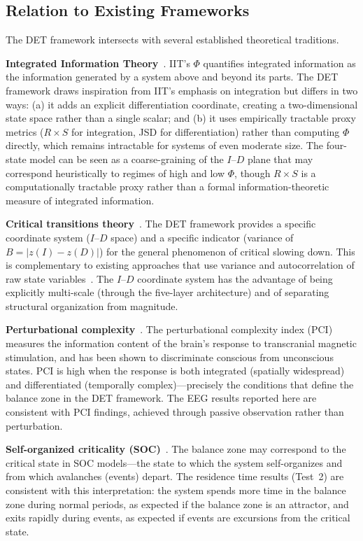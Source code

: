 \documentclass[12pt,a4paper]{article}
\begin{document}
\subsection{Relation to Existing Frameworks}

The DET framework intersects with several established theoretical traditions.

\textbf{Integrated Information Theory}~\cite{tononi2016}. IIT's $\Phi$ quantifies integrated information as the information generated by a system above and beyond its parts. The DET framework draws inspiration from IIT's emphasis on integration but differs in two ways: (a) it adds an explicit differentiation coordinate, creating a two-dimensional state space rather than a single scalar; and (b) it uses empirically tractable proxy metrics ($R \times S$ for integration, JSD for differentiation) rather than computing $\Phi$ directly, which remains intractable for systems of even moderate size. The four-state model can be seen as a coarse-graining of the $I$--$D$ plane that may correspond heuristically to regimes of high and low $\Phi$, though $R \times S$ is a computationally tractable proxy rather than a formal information-theoretic measure of integrated information.

\textbf{Critical transitions theory}~\cite{scheffer2009,strogatz2015}. The DET framework provides a specific coordinate system ($I$--$D$ space) and a specific indicator (variance of $B = |z(I) - z(D)|$) for the general phenomenon of critical slowing down. This is complementary to existing approaches that use variance and autocorrelation of raw state variables~\cite{dakos2012}. The $I$--$D$ coordinate system has the advantage of being explicitly multi-scale (through the five-layer architecture) and of separating structural organization from magnitude.

\textbf{Perturbational complexity}~\cite{casali2013,sarasso2015}. The perturbational complexity index (PCI) measures the information content of the brain's response to transcranial magnetic stimulation, and has been shown to discriminate conscious from unconscious states. PCI is high when the response is both integrated (spatially widespread) and differentiated (temporally complex)---precisely the conditions that define the balance zone in the DET framework. The EEG results reported here are consistent with PCI findings, achieved through passive observation rather than perturbation.

\textbf{Self-organized criticality (SOC)}~\cite{bak1987,olami1992,strogatz2015}. The balance zone may correspond to the critical state in SOC models---the state to which the system self-organizes and from which avalanches (events) depart. The residence time results (Test~2) are consistent with this interpretation: the system spends more time in the balance zone during normal periods, as expected if the balance zone is an attractor, and exits rapidly during events, as expected if events are excursions from the critical state.
\end{document}

